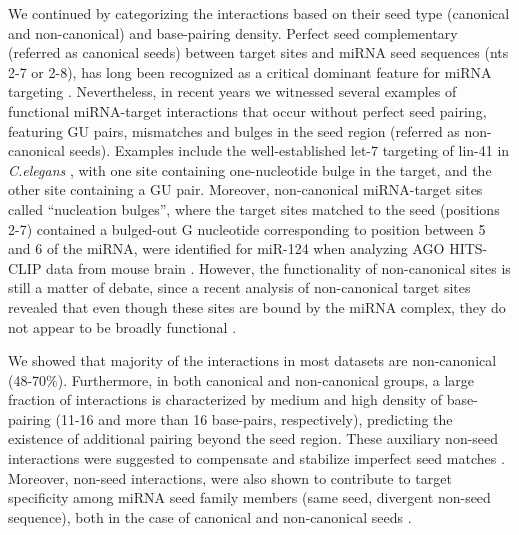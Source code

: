 \documentclass{bmcart}
\begin{document}
We continued by categorizing the interactions based on their seed type (canonical and non-canonical) and base-pairing density. Perfect seed complementary (referred as canonical seeds) between target sites and miRNA seed sequences (nts 2-7 or 2-8), has long been recognized as a critical dominant feature for miRNA targeting \cite{bartel2009micrornas, lewis2005conserved}. Nevertheless, in recent years we witnessed several examples of functional miRNA-target interactions that occur without perfect seed pairing, featuring GU pairs, mismatches and bulges in the seed region (referred as non-canonical seeds). Examples include the well-established let-7 targeting of lin-41 in \textit{C.elegans} \cite{slack2000lin, vella2004c}, with one site containing one-nucleotide bulge in the target, and the other site containing a GU pair. Moreover, non-canonical miRNA-target sites called “nucleation bulges”, where the target sites matched to the seed (positions 2-7) contained a bulged-out G nucleotide corresponding to position between 5 and 6 of the miRNA, were identified for miR-124 when analyzing AGO HITS-CLIP data from mouse brain \cite{chi2012alternative}. However, the functionality of non-canonical sites is still a matter of debate, since a recent analysis of non-canonical target sites revealed that even though these sites are bound by the miRNA complex, they do not appear to be broadly functional \cite{agarwal2015predicting}. 

We showed that majority of the interactions in most datasets are non-canonical (48-70\%). Furthermore, in both canonical and non-canonical groups, a large fraction of interactions is characterized by medium and high density of base-pairing (11-16 and more than 16 base-pairs, respectively), predicting the existence of additional pairing beyond the seed region. These auxiliary non-seed interactions were suggested to compensate and stabilize imperfect seed matches \cite{brennecke2005principles, grimson2007microrna}. Moreover, non-seed interactions, were also shown to contribute to target specificity among miRNA seed family members (same seed, divergent non-seed sequence), both in the case of canonical and non-canonical seeds \cite{broughton2016pairing, darnell_moore2015mirna}.\\
\end{document}
